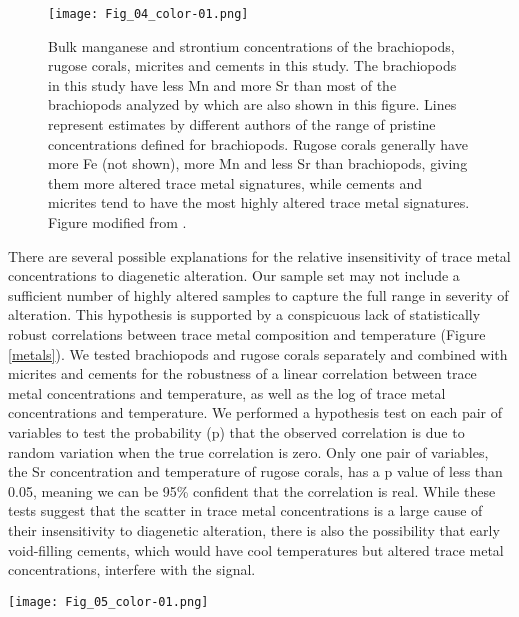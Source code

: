 \documentclass[5p, authoryear]{elsarticle}
\begin{document}
\begin{figure}[h]
\centering
\texttt{[image: Fig\_04\_color-01.png]}
\caption{Bulk manganese and strontium concentrations of the brachiopods, rugose corals, micrites and cements in this study. The brachiopods in this study have less Mn and more Sr than most of the brachiopods analyzed by \cite{Brand2012} which are also shown in this figure. Lines represent estimates by different authors of the range of pristine concentrations defined for brachiopods. Rugose corals generally have more Fe (not shown), more Mn and less Sr than brachiopods, giving them more altered trace metal signatures, while cements and micrites tend to have the most highly altered trace metal signatures. Figure modified from \cite{Brand2012}.}
\label{Brand}
\end{figure}

There are several possible explanations for the relative insensitivity of trace metal concentrations to diagenetic alteration. Our sample set may not include a sufficient number of highly altered samples to capture the full range in severity of alteration. This hypothesis is supported by a conspicuous lack of statistically robust correlations between trace metal composition and temperature (Figure \ref{metals}). We tested brachiopods and rugose corals separately and combined with micrites and cements for the robustness of a linear correlation between trace metal concentrations and temperature, as well as the log of trace metal concentrations and temperature. We performed a hypothesis test on each pair of variables to test the probability (p) that the observed correlation is due to random variation when the true correlation is zero. Only one pair of variables, the Sr concentration and temperature of rugose corals, has a p value of less than 0.05, meaning we can be 95\% confident that the correlation is real. While these tests suggest that the scatter in trace metal concentrations is a large cause of their insensitivity to diagenetic alteration, there is also the possibility that early void-filling cements, which would have cool temperatures but altered trace metal concentrations, interfere with the signal. 

\begin{figure*}[tb]
\centering
\texttt{[image: Fig\_05\_color-01.png]}
\caption{Scatter plots showing the relationship between temperature and bulk trace metal concentrations. The negative correlation between temperature and the log of Sr concentration in rugose corals is statistically robust, and holds up when combined with the rest of the samples, but no other correlations passed our hypothesis tests. These plots demonstrate clear differences in trace metal content between the two fossil taxa and the later carbonate phases. Brachiopods tend to have the most pristine trace metal signatures, with less Mn and more Sr than the other samples. Micrites and cements tend to have the most altered trace metal signatures, with high Fe and Mn and low Sr concentrations. }
\label{metals}
\end{figure*}
\end{document}
